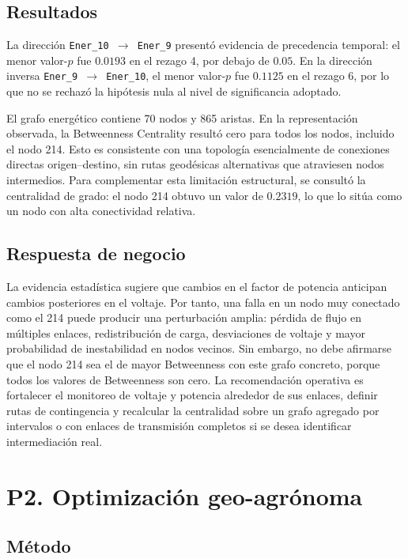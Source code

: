 \documentclass[11pt,a4paper]{article}
\begin{document}
\subsection{Resultados}

La dirección \texttt{Ener\_10 $\rightarrow$ Ener\_9} presentó evidencia de precedencia temporal: el menor valor-$p$ fue $0.0193$ en el rezago 4, por debajo de $0.05$. En la dirección inversa \texttt{Ener\_9 $\rightarrow$ Ener\_10}, el menor valor-$p$ fue $0.1125$ en el rezago 6, por lo que no se rechazó la hipótesis nula al nivel de significancia adoptado.

El grafo energético contiene 70 nodos y 865 aristas. En la representación observada, la Betweenness Centrality resultó cero para todos los nodos, incluido el nodo 214. Esto es consistente con una topología esencialmente de conexiones directas origen--destino, sin rutas geodésicas alternativas que atraviesen nodos intermedios. Para complementar esta limitación estructural, se consultó la centralidad de grado: el nodo 214 obtuvo un valor de $0.2319$, lo que lo sitúa como un nodo con alta conectividad relativa.

\subsection{Respuesta de negocio}

La evidencia estadística sugiere que cambios en el factor de potencia anticipan cambios posteriores en el voltaje. Por tanto, una falla en un nodo muy conectado como el 214 puede producir una perturbación amplia: pérdida de flujo en múltiples enlaces, redistribución de carga, desviaciones de voltaje y mayor probabilidad de inestabilidad en nodos vecinos. Sin embargo, no debe afirmarse que el nodo 214 sea el de mayor Betweenness con este grafo concreto, porque todos los valores de Betweenness son cero. La recomendación operativa es fortalecer el monitoreo de voltaje y potencia alrededor de sus enlaces, definir rutas de contingencia y recalcular la centralidad sobre un grafo agregado por intervalos o con enlaces de transmisión completos si se desea identificar intermediación real.

\section{P2. Optimización geo-agrónoma}

\subsection{Método}
\end{document}
